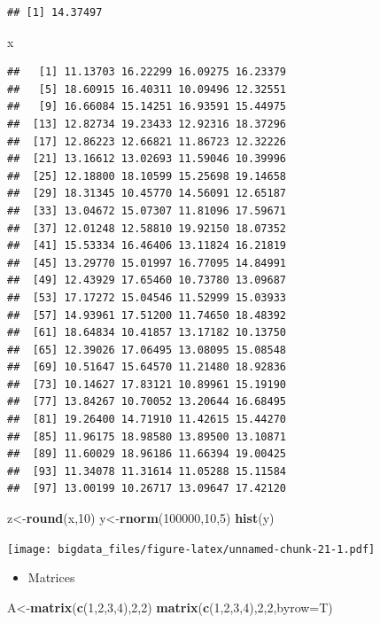 \documentclass[
]{book}
\newenvironment{Shaded}{\begin{snugshade}}{\end{snugshade}}
\newcommand{\DataTypeTok}[1]{\textcolor[rgb]{0.13,0.29,0.53}{#1}}
\newcommand{\DecValTok}[1]{\textcolor[rgb]{0.00,0.00,0.81}{#1}}
\newcommand{\KeywordTok}[1]{\textcolor[rgb]{0.13,0.29,0.53}{\textbf{#1}}}
\newcommand{\NormalTok}[1]{#1}
\providecommand{\tightlist}{%
  \setlength{\itemsep}{0pt}\setlength{\parskip}{0pt}}
\begin{document}
\begin{verbatim}
## [1] 14.37497
\end{verbatim}

\begin{Shaded}
\begin{Highlighting}[]
\NormalTok{x}
\end{Highlighting}
\end{Shaded}

\begin{verbatim}
##   [1] 11.13703 16.22299 16.09275 16.23379
##   [5] 18.60915 16.40311 10.09496 12.32551
##   [9] 16.66084 15.14251 16.93591 15.44975
##  [13] 12.82734 19.23433 12.92316 18.37296
##  [17] 12.86223 12.66821 11.86723 12.32226
##  [21] 13.16612 13.02693 11.59046 10.39996
##  [25] 12.18800 18.10599 15.25698 19.14658
##  [29] 18.31345 10.45770 14.56091 12.65187
##  [33] 13.04672 15.07307 11.81096 17.59671
##  [37] 12.01248 12.58810 19.92150 18.07352
##  [41] 15.53334 16.46406 13.11824 16.21819
##  [45] 13.29770 15.01997 16.77095 14.84991
##  [49] 12.43929 17.65460 10.73780 13.09687
##  [53] 17.17272 15.04546 11.52999 15.03933
##  [57] 14.93961 17.51200 11.74650 18.48392
##  [61] 18.64834 10.41857 13.17182 10.13750
##  [65] 12.39026 17.06495 13.08095 15.08548
##  [69] 10.51647 15.64570 11.21480 18.92836
##  [73] 10.14627 17.83121 10.89961 15.19190
##  [77] 13.84267 10.70052 13.20644 16.68495
##  [81] 19.26400 14.71910 11.42615 15.44270
##  [85] 11.96175 18.98580 13.89500 13.10871
##  [89] 11.60029 18.96186 11.66394 19.00425
##  [93] 11.34078 11.31614 11.05288 15.11584
##  [97] 13.00199 10.26717 13.09647 17.42120
\end{verbatim}

\begin{Shaded}
\begin{Highlighting}[]
\NormalTok{z<-}\KeywordTok{round}\NormalTok{(x,}\DecValTok{10}\NormalTok{)}
\NormalTok{y<-}\KeywordTok{rnorm}\NormalTok{(}\DecValTok{100000}\NormalTok{,}\DecValTok{10}\NormalTok{,}\DecValTok{5}\NormalTok{)}
\KeywordTok{hist}\NormalTok{(y)}
\end{Highlighting}
\end{Shaded}

\texttt{[image: bigdata\_files/figure-latex/unnamed-chunk-21-1.pdf]}

\begin{itemize}
\tightlist
\item
  Matrices
\end{itemize}

\begin{Shaded}
\begin{Highlighting}[]
\NormalTok{A<-}\KeywordTok{matrix}\NormalTok{(}\KeywordTok{c}\NormalTok{(}\DecValTok{1}\NormalTok{,}\DecValTok{2}\NormalTok{,}\DecValTok{3}\NormalTok{,}\DecValTok{4}\NormalTok{),}\DecValTok{2}\NormalTok{,}\DecValTok{2}\NormalTok{)}
\KeywordTok{matrix}\NormalTok{(}\KeywordTok{c}\NormalTok{(}\DecValTok{1}\NormalTok{,}\DecValTok{2}\NormalTok{,}\DecValTok{3}\NormalTok{,}\DecValTok{4}\NormalTok{),}\DecValTok{2}\NormalTok{,}\DecValTok{2}\NormalTok{,}\DataTypeTok{byrow=}\NormalTok{T)}
\end{Highlighting}
\end{Shaded}
\end{document}
